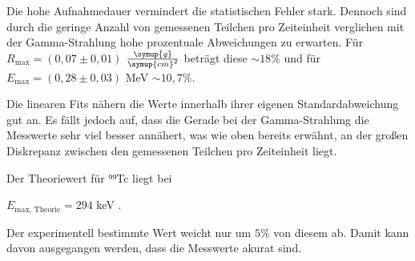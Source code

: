 Die hohe Aufnahmedauer vermindert die statistischen Fehler stark. Dennoch sind durch die geringe Anzahl von gemessenen Teilchen pro Zeiteinheit
verglichen mit der Gamma-Strahlung hohe prozentuale Abweichungen zu erwarten.
Für $R_\text{max} = (0,07 \pm 0,01)$ $\frac{\symup{g}}{\symup{cm}^2}$ beträgt diese $\sim \! 18 \%$ und für $E_\text{max} = (0,28 \pm 0,03)$ MeV $\sim \! 10,7 \%$.

Die linearen Fits nähern die Werte innerhalb ihrer eigenen Standardabweichung gut an. 
Es fällt jedoch auf, dass die Gerade bei der Gamma-Strahlung die Messwerte sehr viel besser annähert,
was wie oben bereits erwähnt, an der großen Diskrepanz zwischen den gemessenen Teilchen pro Zeiteinheit liegt.

Der Theoriewert für ⁹⁹Tc liegt bei 

\begin{center}
    $E_\text{max, Theorie} = 294$ keV \cite{technetium}.
\end{center}

Der experimentell bestimmte Wert weicht nur um $5\%$ von diesem ab. Damit kann davon ausgegangen werden, dass die Messwerte akurat sind.